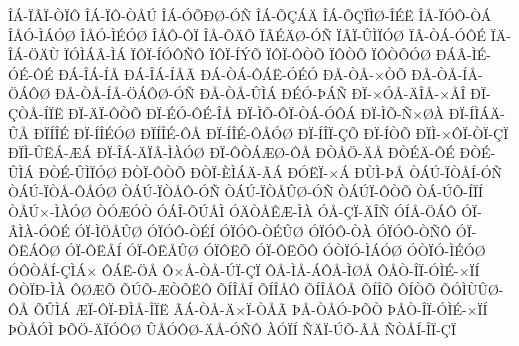 {^^ce^^c1-^^cf^^c2^^cf-^^d2^^cf^^d4
^^ce^^c1-^^cf^^d4-^^d2^^c5^^da
^^ce^^c1-^^d3^^d5^^d0^^d8-^^d3^^d1
^^ce^^c1-^^d5^^c7^^c1^^c4
^^ce^^c1-^^d5^^c7^^cf^^cc^^d8-^^ce^^c9^^cb
^^ce^^c5-^^cf^^d3^^d4-^^d2^^c1
^^ce^^c5^^d3-^^cc^^c1^^d3^^d8
^^ce^^c5^^d3-^^cc^^c9^^d3^^d8
^^ce^^c5^^d4-^^d4^^cf
^^ce^^c5-^^d5^^c4^^d5
^^cf^^c2^^c9^^c4^^d8-^^d3^^d1
^^cf^^c2^^cf-^^db^^cc^^cf^^d3^^d8
^^cf^^c2-^^d2^^c1-^^d3^^d4^^c9
^^cf^^c4-^^ce^^c1-^^d6^^c4^^d9
^^cf^^d3^^cc^^c1^^c2-^^cc^^c1
^^cf^^d4^^cf-^^cd^^d3^^d4^^d1^^d4
^^cf^^d4^^cf-^^cd^^dd^^d5
^^cf^^d4^^cf-^^d4^^d2^^d5
^^cf^^d4^^d2^^d5
^^cf^^d4^^d2^^d5^^d3^^d8
^^d0^^c1^^c2-^^cc^^c9-^^d3^^c9-^^d4^^c9
^^d0^^c1-^^ce^^c1-^^cd^^c5
^^d0^^c1-^^ce^^c1-^^cd^^c5^^c3
^^d0^^c1-^^d2^^c1-^^d4^^c1^^cb-^^d3^^c9^^d3
^^d0^^c5-^^d2^^c5-^^d7^^d2^^d5
^^d0^^c5-^^d2^^c5-^^cd^^c5-^^d6^^c1^^d4^^d8
^^d0^^c5-^^d2^^c5-^^cd^^c5-^^d6^^c1^^d4^^d8-^^d3^^d1
^^d0^^c5-^^d2^^c5-^^db^^cc^^c1
^^d0^^c9^^d3-^^de^^c1^^d1
^^d0^^cf-^^d7^^d3^^c5-^^c4^^ce^^c5-^^d7^^c5^^ce
^^d0^^cf-^^c7^^d2^^c5-^^cd^^cf^^cb
^^d0^^cf-^^c4^^cf-^^d4^^d2^^d5
^^d0^^cf-^^c9^^d3-^^d4^^c9-^^ce^^c5
^^d0^^cf-^^cc^^d5-^^d4^^cf-^^d2^^c1-^^d3^^d4^^c1
^^d0^^cf-^^cc^^d5-^^d1^^d7^^d8^^c0
^^d0^^cf-^^cd^^cc^^c1^^c4-^^db^^c5
^^d0^^cf^^cd^^ce^^c9
^^d0^^cf-^^cd^^ce^^c9^^d3^^d8
^^d0^^cf^^cd^^ce^^c9-^^d4^^c5
^^d0^^cf-^^cd^^ce^^c9-^^d4^^c5^^d3^^d8
^^d0^^cf-^^cd^^ce^^cf-^^c7^^d5
^^d0^^cf-^^cd^^d2^^d5
^^d0^^cf^^cc-^^d7^^d4^^cf-^^d2^^cf-^^c7^^cf
^^d0^^cf^^cc-^^db^^cb^^c1-^^c6^^c1
^^d0^^cf-^^ce^^c1-^^c4^^cf^^c2-^^cc^^c0^^d3^^d8
^^d0^^cf-^^d4^^d2^^c1^^c6^^d8-^^d4^^c5
^^d0^^d2^^c5^^d6-^^c4^^c5
^^d0^^d2^^c9^^c4-^^d4^^c9
^^d0^^d2^^c9-^^db^^cc^^c1
^^d0^^d2^^c9-^^db^^cc^^cf^^d3^^d8
^^d0^^d2^^cf-^^d4^^d2^^d5
^^d0^^d2^^cf-^^c8^^cc^^c1^^c4-^^c3^^c1
^^d0^^d3^^cb^^cf-^^d7^^c1
^^d0^^d9^^cc-^^de^^c5
^^d2^^c1^^da-^^cf^^d2^^c5^^cd-^^d3^^d1
^^d2^^c1^^da-^^cf^^d2^^c5-^^d4^^c5^^d3^^d8
^^d2^^c1^^da-^^cf^^d2^^c5^^d4-^^d3^^d1
^^d2^^c1^^da-^^cf^^d2^^c5^^db^^d8-^^d3^^d1
^^d2^^c1^^da^^cf-^^d4^^d2^^d5
^^d2^^c1-^^da^^d5-^^cd^^cf^^cd
^^d2^^c5^^da^^d7-^^cc^^c0^^d3^^d8
^^d2^^d3^^c6^^d3^^d2
^^d3^^c1^^ce-^^d5^^da^^c5^^cc
^^d3^^c4^^d2^^c5^^ca^^c6-^^cc^^c0
^^d3^^c5-^^c7^^cf-^^c4^^ce^^d1
^^d3^^cd^^c5-^^d6^^c1^^d4
^^d3^^cf-^^c2^^cc^^c0-^^d3^^d4^^c9
^^d3^^cf-^^cc^^d6^^c5^^db^^d8
^^d3^^cf^^d3^^d4-^^d2^^c9^^cd
^^d3^^cf^^d3^^d4-^^d2^^c9^^db^^d8
^^d3^^cf^^d3^^d4-^^d2^^c0
^^d3^^cf^^d3^^d4-^^d2^^d1^^d4
^^d3^^cf-^^d4^^cb^^c1^^d4^^d8
^^d3^^cf-^^d4^^cb^^c5^^cd
^^d3^^cf-^^d4^^cb^^c5^^db^^d8
^^d3^^cf^^d4^^cb^^d5
^^d3^^cf-^^d4^^cb^^d5^^d4
^^d3^^d2^^cf^^d3-^^cc^^c1^^d3^^d8
^^d3^^d2^^cf^^d3-^^cc^^c9^^d3^^d8
^^d3^^d4^^d2^^c5^^cd-^^c7^^cc^^c1^^d7
^^d4^^c1^^cb-^^d6^^c5
^^d4^^d7^^c5-^^d2^^c5-^^da^^cf-^^c7^^cf
^^d4^^c5-^^cc^^c5-^^c1^^d4^^c5-^^cc^^d8^^c5
^^d4^^c5^^d2-^^ce^^cf-^^d3^^cc^^c9-^^d7^^cf^^cd
^^d4^^d2^^cf^^d0-^^cc^^c0
^^d4^^d8^^c6^^d5
^^d5^^da^^d5-^^c6^^d2^^d5^^cb^^d4
^^d5^^cd^^ce^^c5^^cd
^^d5^^cd^^ce^^c5^^d4
^^d5^^cd^^ce^^c5^^d4^^c5
^^d5^^cd^^ce^^d5
^^d5^^cd^^d2^^d5
^^d5^^d3^^cc^^d9^^db^^d8-^^d4^^c5
^^d5^^db^^cc^^c1
^^c6^^cf-^^d4^^cf-^^d0^^cc^^c5-^^ce^^cf^^cb
^^c3^^c1-^^d2^^c5-^^c4^^d7^^cf-^^d2^^c5^^c3
^^de^^c5-^^d2^^c5^^d3-^^de^^d5^^d2
^^de^^c5^^d2-^^ce^^cf-^^d3^^cc^^c9-^^d7^^cf^^cd
^^de^^d2^^c5^^d3^^cc
^^de^^d5^^d6-^^c4^^cf^^d3^^d4^^d8
^^db^^c5^^d3^^d4^^d8-^^c4^^c5-^^d3^^d1^^d4
^^c0^^d3^^cf^^cd
^^d1^^c4^^cf-^^da^^d5-^^c2^^c5
^^d1^^d2^^c5^^cd-^^ce^^cf-^^c7^^cf
}
